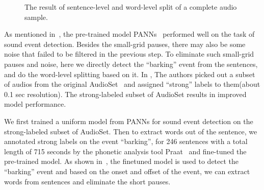 \begin{figure}[th]
\centering
{}
\caption{The result of sentence-level and word-level split of a complete audio sample.}
\label{fig:datasample}
\end{figure}

As mentioned in~, the pre-trained model PANNs~\cite{kong2020panns} performed well on the task of sound event detection. 
Besides the small-grid pauses, there may also be some noise that failed to be filtered in the previous step. To eliminate such small-grid pauses and noise, here we directly detect the ``barking'' event from the sentences, and do the word-level splitting based on it. In \citet{hershey2021benefit}, The authors picked out a subset of audios from the original AudioSet~\cite{gemmeke2017audio} and assigned ``strong'' labels to them(about 0.1 sec resolution). The strong-labeled subset of AudioSet results in improved model performance.

We first trained a uniform model from PANNs for sound event detection on the strong-labeled subset of AudioSet. Then to extract words out of the sentence, we annotated strong labels on the event ``barking'', for 246 sentences with a total length of 715 seconds by the phonetic analysis tool Praat~\cite{boersma2001speak} and fine-tuned the pre-trained model. As shown in~, the finetuned model is used to detect the ``barking'' event and based on the onset and offset of the event, we can extract words from sentences and eliminate the short pauses.



